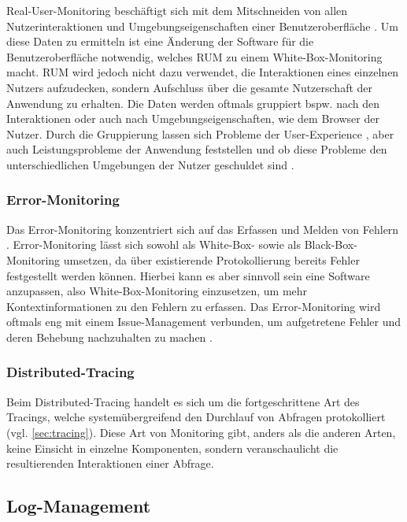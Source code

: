 Real-User-Monitoring beschäftigt sich mit dem Mitschneiden von allen Nutzerinteraktionen und Umgebungseigenschaften einer Benutzeroberfläche \cite{IdentifyingWebPerformanceDegradations}. Um diese Daten zu ermitteln ist eine Änderung der Software für die Benutzeroberfläche notwendig, welches RUM zu einem White-Box-Monitoring macht. RUM wird jedoch nicht dazu verwendet, die Interaktionen eines einzelnen Nutzers aufzudecken, sondern Aufschluss über die gesamte Nutzerschaft der Anwendung zu erhalten. Die Daten werden oftmals gruppiert bspw. nach den Interaktionen oder auch nach Umgebungseigenschaften, wie dem Browser der Nutzer. Durch die Gruppierung lassen sich Probleme der User-Experience \cite{AConceptLatticeForRecognitionOfUserProblems}, aber auch Leistungsprobleme der Anwendung feststellen und ob diese Probleme den unterschiedlichen Umgebungen der Nutzer geschuldet sind \cite{IdentifyingWebPerformanceDegradations}.

\subsubsection{Error-Monitoring}

Das Error-Monitoring konzentriert sich auf das Erfassen und Melden von Fehlern \cite{CrashbinCrashMonitoring}. Error-Monitoring lässt sich sowohl als White-Box- sowie als Black-Box-Monitoring umsetzen, da über existierende Protokollierung bereits Fehler festgestellt werden können. Hierbei kann es aber sinnvoll sein eine Software anzupassen, also White-Box-Monitoring einzusetzen, um mehr Kontextinformationen zu den Fehlern zu erfassen. Das Error-Monitoring wird oftmals eng mit einem Issue-Management verbunden, um aufgetretene Fehler und deren Behebung nachzuhalten zu machen \cite{CrashbinCrashMonitoring}.

\subsubsection{Distributed-Tracing}

Beim Distributed-Tracing handelt es sich um die fortgeschrittene Art des Tracings, welche systemübergreifend den Durchlauf von Abfragen protokolliert (vgl. \autoref{sec:tracing}). Diese Art von Monitoring gibt, anders als die anderen Arten, keine Einsicht in einzelne Komponenten, sondern veranschaulicht die resultierenden Interaktionen einer Abfrage.

\subsection{Log-Management}

